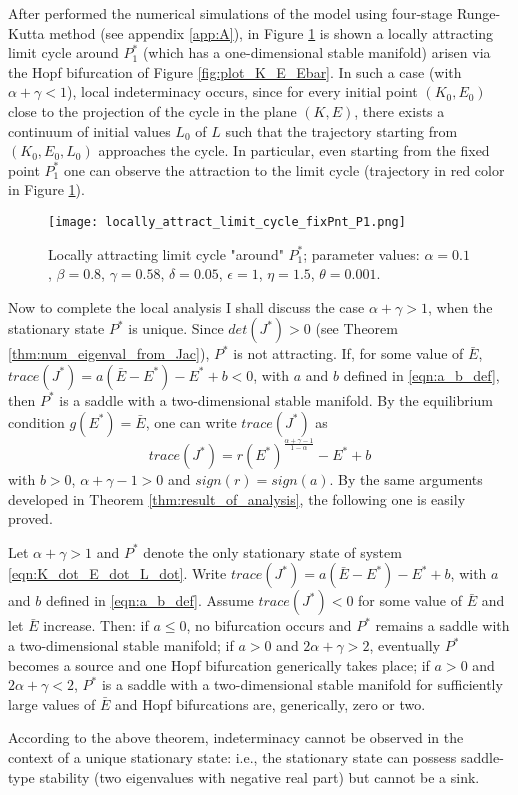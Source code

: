 After performed the numerical simulations of the model using four-stage Runge-Kutta method (see appendix \ref{app:A}), in Figure \ref{fig:local_attract_lim_cycle_P1} is shown a locally attracting limit cycle around $P_1^*$ (which has a one-dimensional stable manifold) arisen via the Hopf bifurcation of Figure \ref{fig:plot_K_E_Ebar}. In such a case (with $\alpha+\gamma<1$), local indeterminacy occurs, since for every initial point $(K_0,E_0)$ close to the projection of the cycle in the plane $(K,E)$, there exists a continuum of initial values $L_0$ of $L$ such that the trajectory starting from $(K_0,E_0,L_0)$ approaches the cycle. In particular, even starting from the fixed point  $P_1^*$ one can observe the attraction to the limit cycle (trajectory in red color in Figure \ref{fig:local_attract_lim_cycle_P1}).
\begin{figure}[h!]
	\centering
	\texttt{[image: locally\_attract\_limit\_cycle\_fixPnt\_P1.png]}
	\caption{Locally attracting limit cycle "around" $P_1^*$; parameter values: $\alpha=0.1$, $\beta=0.8$, $\gamma=0.58$, $\delta=0.05$, $\epsilon=1$, $\eta=1.5$, $\theta=0.001$.}
	\label{fig:local_attract_lim_cycle_P1}
\end{figure}

Now to complete the local analysis I shall discuss the case $\alpha+\gamma>1$, when the stationary state $P^*$ is unique. Since $det(J^*) > 0$ (see Theorem \ref{thm:num_eigenval_from_Jac}), $P^*$ is not attracting. If, for some value of $\bar{E}$, $trace(J^*)=a(\bar{E}-E^*)-E^*+b<0$, with $a$ and $b$ defined in \eqref{eqn:a_b_def}, then $P^*$ is a saddle with a two-dimensional stable manifold. By the equilibrium condition $g(E^*)=\bar{E}$, one can write $trace(J^*)$ as
$$trace(J^*)=r(E^*)^{\frac{\alpha+\gamma-1}{1-\alpha}}-E^*+b$$
with $b>0$, $\alpha+\gamma-1>0$ and $sign(r)=sign(a)$. 
By the same arguments developed in Theorem \ref{thm:result_of_analysis}, the following one is easily proved.
\begin{thm} \label{thm:5_no_indeter_with_unique_fixPnt}
	Let $\alpha+\gamma>1$ and $P^*$ denote the only stationary state of system \eqref{eqn:K_dot_E_dot_L_dot}. Write $trace(J^*)=a(\bar{E}-E^*)-E^*+b$, with $a$ and $b$ defined in \eqref{eqn:a_b_def}. Assume $trace(J^*) < 0$ for some value of $\bar{E}$ and let $\bar{E}$ increase. Then: if $a\leq0$, no bifurcation occurs and $P^*$ remains a saddle with a two-dimensional stable manifold; if $a>0$ and $2\alpha+\gamma>2$, eventually $P^*$ becomes a source and one Hopf bifurcation generically takes place; if $a>0$ and $2\alpha+\gamma<2$, $P^*$ is a saddle with a two-dimensional stable manifold for sufficiently large values of $\bar{E}$ and Hopf bifurcations are, generically, zero or two.
\end{thm}
According to the above theorem, indeterminacy cannot be observed in the context of a unique stationary state: i.e., the stationary state can possess saddle-type stability (two eigenvalues with negative real part) but cannot be a sink.